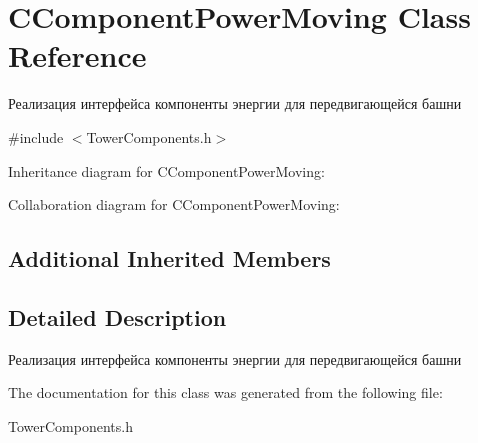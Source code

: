 \hypertarget{classCComponentPowerMoving}{}\section{C\+Component\+Power\+Moving Class Reference}
\label{classCComponentPowerMoving}


Реализация интерфейса компоненты энергии для передвигающейся башни  




{\ttfamily \#include $<$Tower\+Components.\+h$>$}



Inheritance diagram for C\+Component\+Power\+Moving\+:


Collaboration diagram for C\+Component\+Power\+Moving\+:
\subsection*{Additional Inherited Members}


\subsection{Detailed Description}
Реализация интерфейса компоненты энергии для передвигающейся башни 

The documentation for this class was generated from the following file\+:\begin{DoxyCompactItemize}
\item 
Tower\+Components.\+h\end{DoxyCompactItemize}
